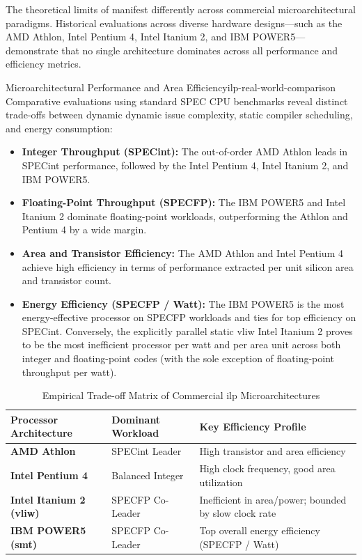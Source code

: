 The theoretical limits of  manifest differently across commercial microarchitectural paradigms. Historical evaluations across diverse hardware designs—such as the AMD Athlon, Intel Pentium 4, Intel Itanium 2, and IBM POWER5—demonstrate that no single architecture dominates across all performance and efficiency metrics.

\begin{observation}{Microarchitectural Performance and Area Efficiency}{ilp-real-world-comparison}
Comparative evaluations using standard SPEC CPU benchmarks reveal distinct trade-offs between dynamic dynamic issue complexity, static compiler scheduling, and energy consumption:
\begin{itemize}
    \item \textbf{Integer Throughput (SPECint):} The out-of-order AMD Athlon leads in SPECint performance, followed by the Intel Pentium 4, Intel Itanium 2, and IBM POWER5.
    \item \textbf{Floating-Point Throughput (SPECFP):} The IBM POWER5 and Intel Itanium 2 dominate floating-point workloads, outperforming the Athlon and Pentium 4 by a wide margin.
    \item \textbf{Area and Transistor Efficiency:} The AMD Athlon and Intel Pentium 4 achieve high efficiency in terms of performance extracted per unit silicon area and transistor count.
    \item \textbf{Energy Efficiency (SPECFP / Watt):} The IBM POWER5 is the most energy-effective processor on SPECFP workloads and ties for top efficiency on SPECint. Conversely, the explicitly parallel static \gls{vliw} Intel Itanium 2 proves to be the most inefficient processor per watt and per area unit across both integer and floating-point codes (with the sole exception of floating-point throughput per watt).
\end{itemize}
\end{observation}

\begin{table}[htbp]
\centering
\caption{Empirical Trade-off Matrix of Commercial \gls{ilp} Microarchitectures}
\label{tab:real_world_ilp_processors}
\small
\setlength{\tabcolsep}{5pt}
\begin{tabularx}{\textwidth}{|>{\hsize=0.8\hsize\raggedright\arraybackslash}X|>{\hsize=1.0\hsize\raggedright\arraybackslash}X|>{\hsize=1.2\hsize\raggedright\arraybackslash}X|}
\hline
\textbf{Processor Architecture} & \textbf{Dominant Workload} & \textbf{Key Efficiency Profile} \\ \hline
\textbf{AMD Athlon} & SPECint Leader & High transistor and area efficiency \\ \hline
\textbf{Intel Pentium 4} & Balanced Integer & High clock frequency, good area utilization \\ \hline
\textbf{Intel Itanium 2 (\gls{vliw})} & SPECFP Co-Leader & Inefficient in area/power; bounded by slow clock rate \\ \hline
\textbf{IBM POWER5 (\gls{smt})} & SPECFP Co-Leader & Top overall energy efficiency (SPECFP / Watt) \\ \hline
\end{tabularx}
\end{table}

